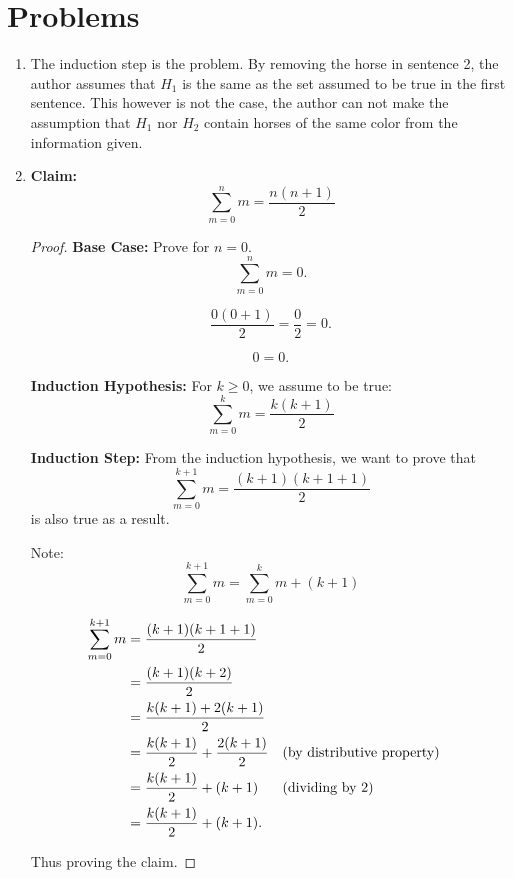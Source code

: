\documentclass{article}
\begin{document}
\section{Problems}
\begin{enumerate}
    \item %
        The induction step is the problem. By removing the horse in sentence 2, the author assumes that $H_1$ is the same as the set assumed to be true in the first sentence. This however is not the case, the author can not make the assumption that $H_1$ nor $H_2$ contain horses of the same color from the information given.
    \item %
        \textbf{Claim:}
        \[
            \sum_{m=0}^n m = \frac{n(n+1)}{2}
        \]
        \begin{proof}
            \textbf{Base Case:} Prove for $n = 0$.
            \[
                \sum_{m=0}^n m = 0.
            \]

            \[
                \frac{0(0+1)}{2} = \frac{0}{2} = 0.
            \]

            \[
                0 = 0.
            \]

            \textbf{Induction Hypothesis:} For $k \geq 0$,  we assume to be true:
            \[
                \sum_{m=0}^k m = \frac{k(k+1)}{2}
            \]

            \textbf{Induction Step:} From the induction hypothesis, we want to prove that
            \[
                \sum_{m=0}^{k+1} m = \frac{(k+1)(k+1+1)}{2}
            \]
            is also true as a result.

            Note:
            \[
                \sum_{m=0}^{k+1} m = \sum_{m=0}^k m + (k + 1)
            \]

            \begin{align*}
                \sum_{m=0}^{k+1} m &= \frac{(k+1)(k+1+1)}{2} \\
                &= \frac{(k+1)(k+2)}{2} \\
                &= \frac{k(k+1) + 2(k+1)}{2} \\
                &= \frac{k(k+1)}{2} + \frac{2(k+1)}{2} &&\text{(by distributive property)}\\
                &= \frac{k(k+1)}{2} + (k+1) &&\text{(dividing by 2)}\\
                &= \frac{k(k+1)}{2} + (k+1).
                &&\qedhere
            \end{align*}

            Thus proving the claim.
        \end{proof}
\end{enumerate}
\end{document}
